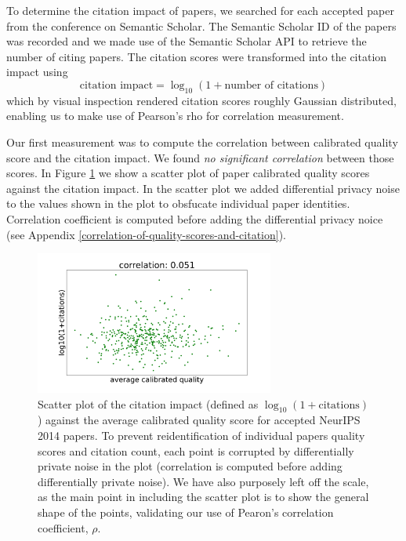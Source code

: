 \documentclass[twoside]{article}
\begin{document}
To determine the citation impact of papers, we searched for each accepted paper from the conference on Semantic Scholar. The Semantic Scholar ID of the papers was recorded and we made use of the Semantic Scholar API to retrieve the number of citing papers. The citation scores were transformed into the citation impact using
$$
\text{citation impact} = \log_{10} (1 + \text{number of citations})
$$
which by visual inspection rendered citation scores roughly Gaussian distributed, enabling us to make use of Pearson's rho for correlation measurement.

Our first measurement was to compute the correlation between calibrated quality score and the citation impact. We found \emph{no significant correlation} between those scores. In Figure \ref{figure-citations-vs-average-calibrated-quality-accept} we show a scatter plot of paper calibrated quality scores against the citation impact. In the scatter plot we added differential privacy noise to the values shown in the plot to obsfucate individual paper identities. Correlation coefficient is computed before adding the differential privacy noice (see Appendix \ref{correlation-of-quality-scores-and-citation}).

\begin{figure}[htb]
  \begin{center}
    \includegraphics[width=0.70\textwidth]{diagrams/neurips/citations-vs-average-calibrated-quality-accept.pdf}
  \end{center}
  \caption{Scatter plot of the citation impact (defined as $\log_{10}(1+\text{citations})$) against the average calibrated quality score for accepted NeurIPS 2014 papers. To prevent reidentification of individual papers quality scores and citation count, each point is corrupted by differentially private noise in the plot (correlation is computed before adding differentially private noise). We have also purposely left off the scale, as the main point in including the scatter plot is to show the general shape of the points, validating our use of Pearon's correlation coefficient, $\rho$.}
  \label{figure-citations-vs-average-calibrated-quality-accept}
\end{figure}
\end{document}
